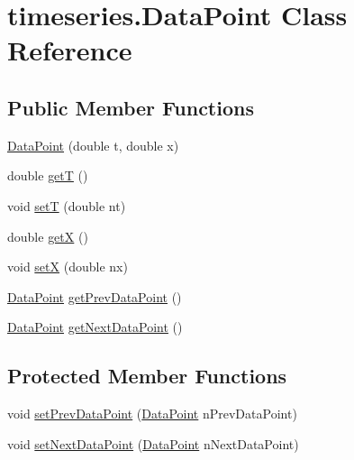 \hypertarget{classtimeseries_1_1_data_point}{}\section{timeseries.\+Data\+Point Class Reference}
\label{classtimeseries_1_1_data_point}
\subsection*{Public Member Functions}
\begin{DoxyCompactItemize}
\item 
\hyperlink{classtimeseries_1_1_data_point_a31e9ba537d579768c35a99ca88b75c34}{Data\+Point} (double t, double x)
\item 
double \hyperlink{classtimeseries_1_1_data_point_a94f032b66174ae79c3ee47d5134408d8}{get\+T} ()
\item 
void \hyperlink{classtimeseries_1_1_data_point_a06c7f4942e871d604ef4b4ca91a92420}{set\+T} (double nt)
\item 
double \hyperlink{classtimeseries_1_1_data_point_a862374b58fe1d257afec950fd0088b3f}{get\+X} ()
\item 
void \hyperlink{classtimeseries_1_1_data_point_a9c428f60adc11fdfd703ed9c2b7ad2bd}{set\+X} (double nx)
\item 
\hyperlink{classtimeseries_1_1_data_point}{Data\+Point} \hyperlink{classtimeseries_1_1_data_point_af26707915ac85c5c18ad8a2be4266c3d}{get\+Prev\+Data\+Point} ()
\item 
\hyperlink{classtimeseries_1_1_data_point}{Data\+Point} \hyperlink{classtimeseries_1_1_data_point_ad6f4ba2c6a17750e5c3e19341a057958}{get\+Next\+Data\+Point} ()
\end{DoxyCompactItemize}
\subsection*{Protected Member Functions}
\begin{DoxyCompactItemize}
\item 
void \hyperlink{classtimeseries_1_1_data_point_adaf6a8f0dbd394d88cf46ee5f6656f65}{set\+Prev\+Data\+Point} (\hyperlink{classtimeseries_1_1_data_point}{Data\+Point} n\+Prev\+Data\+Point)
\item 
void \hyperlink{classtimeseries_1_1_data_point_a7e185c8a08f24b967e6a54c3305e04b5}{set\+Next\+Data\+Point} (\hyperlink{classtimeseries_1_1_data_point}{Data\+Point} n\+Next\+Data\+Point)
\end{DoxyCompactItemize}


